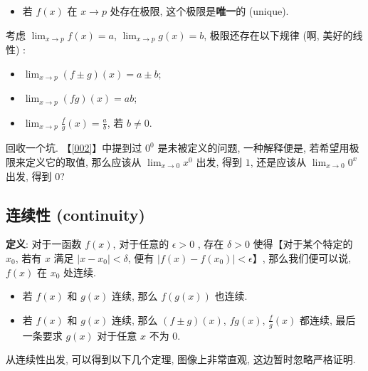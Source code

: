 \begin{itemize}

\item
  若 $f(x)$ 在 $x\rightarrow p$ 处存在极限,
  这个极限是\textbf{唯一}的 (unique).
\end{itemize}

考虑 $\lim_{x\rightarrow p}f(x)=a$, $\lim_{x\rightarrow p}g(x)=b$,
极限还存在以下规律 (啊, 美好的线性) :

\begin{itemize}

\item
  $\lim_{x\rightarrow p}(f\pm g)(x)=a\pm b$;
\item
  $\lim_{x\rightarrow p}(fg)(x)=ab$;
\item
  $\lim_{x\rightarrow p}\frac{f}{g}(x)=\frac{a}{b}$, 若 $b\neq 0$.
\end{itemize}

\begin{newquote}
回收一个坑. 【\ref{002}】中提到过 $\mathrm{0}^0$ 是未被定义的问题,
一种解释便是, 若希望用极限来定义它的取值, 那么应该从
$\lim_{x\rightarrow0}x^0$ 出发, 得到 $1$, 还是应该从
$\lim_{x\rightarrow0}0^x$ 出发, 得到 $0$?
\end{newquote}


\subsection{连续性 (continuity)}

\textbf{定义}: 对于一函数 $f(x)$, 对于任意的 $\epsilon>0$ , 存在
$\delta>0$ 使得【对于某个特定的 $x_0$, 若有 $x$ 满足
$|x-x_0|<\delta$, 便有 $|f(x)-f(x_0)|<\epsilon$】, 那么我们便可以说,
$f(x)$ 在 $x_0$ 处连续.

\begin{itemize}

\item
  若 $f(x)$ 和 $g(x)$ 连续, 那么 $f(g(x))$ 也连续.
\item
  若 $f(x)$ 和 $g(x)$ 连续, 那么 $(f\pm g)(x)$, $fg(x)$,
  $\frac{f}{g}(x)$ 都连续, 最后一条要求 $g(x)$ 对于任意 $x$ 不为
  $0$.
\end{itemize}

从连续性出发, 可以得到以下几个定理, 图像上非常直观, 这边暂时忽略严格证明.

